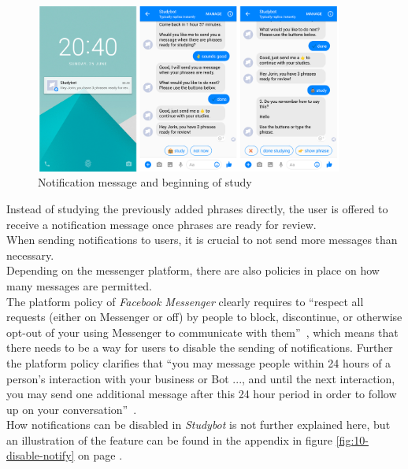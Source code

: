 \begin{figure}[h]
  \centering
  \includegraphics[width=0.9\textwidth]{images/interface/07-notify-study.png}
	\caption{Notification message and beginning of study}
	\label{fig:07-notify-study}
\end{figure}

Instead of studying the previously added phrases directly,
the user is offered to receive a notification message once phrases are ready for review.
\\

When sending notifications to users, it is crucial to not send more messages than necessary.
\\
Depending on the messenger platform, there are also policies in place on how many messages are permitted.
\\
The platform policy of \emph{Facebook Messenger} clearly requires to
``respect all requests (either on Messenger or off) by people to block, discontinue, or otherwise opt-out of your using Messenger to communicate with them''~\cite{fbpolicy},
which means that there needs to be a way for users to disable the sending of notifications.
Further the platform policy clarifies that ``you may message people within 24 hours of a person's interaction with your business or Bot ..., and until the next interaction, you may send one additional message after this 24 hour period in order to follow up on your conversation''~\cite{fbpolicy}.
\\
How notifications can be disabled in \emph{Studybot} is not further explained here,
but an illustration of the feature can be found in the appendix in figure \ref{fig:10-disable-notify} on page \pageref{fig:10-disable-notify}.
\\

